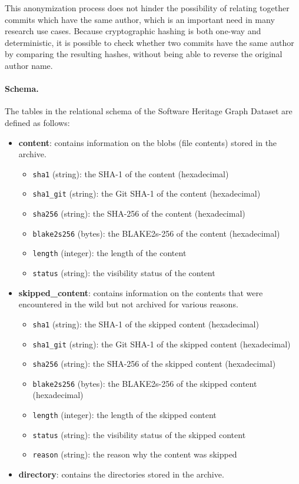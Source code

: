 This anonymization process does not hinder the possibility of relating together
commits which have the same author, which is an important need in many research
use cases. Because cryptographic hashing is both one-way and deterministic, it
is possible to check whether two commits have the same author by comparing the
resulting hashes, without being able to reverse the original author name.

\paragraph*{Schema.}
The tables in the relational schema of the Software Heritage Graph Dataset are
defined as follows:


\begin{itemize}
\item
  \textbf{content}: contains information on the blobs (file contents) stored in
    the archive.

  \begin{itemize}
  \tightlist
  \item
    \texttt{sha1} (string): the SHA-1 of the content (hexadecimal)
  \item
    \texttt{sha1\_git} (string): the Git SHA-1 of the content
    (hexadecimal)
  \item
    \texttt{sha256} (string): the SHA-256 of the content (hexadecimal)
  \item
    \texttt{blake2s256} (bytes): the BLAKE2s-256 of the content
    (hexadecimal)
  \item
    \texttt{length} (integer): the length of the content
  \item
    \texttt{status} (string): the visibility status of the content
  \end{itemize}
\item
  \textbf{skipped\_content}: contains information on the contents that
  were encountered in the wild but not archived for various reasons.

  \begin{itemize}
  \tightlist
  \item
    \texttt{sha1} (string): the SHA-1 of the skipped content
    (hexadecimal)
  \item
    \texttt{sha1\_git} (string): the Git SHA-1 of the skipped content
    (hexadecimal)
  \item
    \texttt{sha256} (string): the SHA-256 of the skipped content
    (hexadecimal)
  \item
    \texttt{blake2s256} (bytes): the BLAKE2s-256 of the skipped content
    (hexadecimal)
  \item
    \texttt{length} (integer): the length of the skipped content
  \item
    \texttt{status} (string): the visibility status of the skipped
    content
  \item
    \texttt{reason} (string): the reason why the content was skipped
  \end{itemize}
\item
  \textbf{directory}: contains the directories stored in the archive.


\end{itemize}
